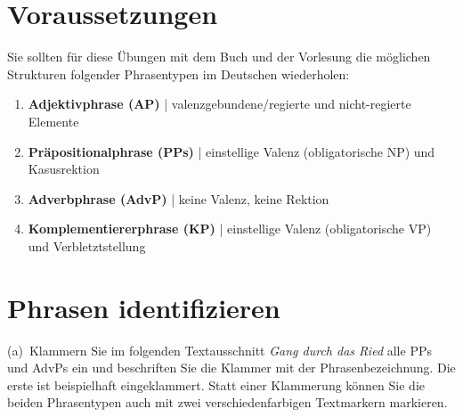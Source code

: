 \section*{Voraussetzungen}

Sie sollten für diese Übungen mit dem Buch und der Vorlesung die möglichen Strukturen folgender Phrasentypen im Deutschen wiederholen:

\begin{enumerate}\Lf
  \item \textbf{Adjektivphrase (AP)} | valenzgebundene\slash regierte und nicht-regierte Elemente
  \item \textbf{Präpositionalphrase (PPs)} | einstellige Valenz (obligatorische NP) und Kasusrektion
  \item \textbf{Adverbphrase (AdvP)} | keine Valenz, keine Rektion
  \item \textbf{Komplementiererphrase (KP)} | einstellige Valenz (obligatorische VP) und Verbletztstellung
\end{enumerate}

\section{Phrasen identifizieren}\label{sec:erkennen}

(a)~Klammern Sie im folgenden Textausschnitt \textit{Gang durch das Ried} alle PPs und AdvPs ein und beschriften Sie die Klammer mit der Phrasenbezeichnung.
Die erste ist beispielhaft eingeklammert.
Statt einer Klammerung können Sie die beiden Phrasentypen auch mit zwei verschiedenfarbigen Textmarkern markieren.

